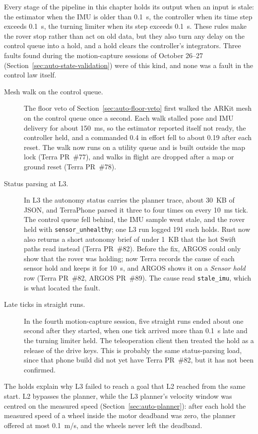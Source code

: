Every stage of the pipeline in this chapter holds its output when an input is stale: the estimator when the IMU is older than 0.1~s, the controller when its time step exceeds 0.1~s, the turning limiter when its step exceeds 0.1~s.
These rules make the rover stop rather than act on old data, but they also turn any delay on the control queue into a hold, and a hold clears the controller's integrators.
Three faults found during the motion-capture sessions of October 26--27 (Section~\ref{sec:auto-state-validation}) were of this kind, and none was a fault in the control law itself.

\begin{description}
\item[Mesh walk on the control queue.] The floor veto of Section~\ref{sec:auto-floor-veto} first walked the ARKit mesh on the control queue once a second. Each walk stalled pose and IMU delivery for about 150~ms, so the estimator reported itself not ready, the controller held, and a commanded 0.4 in effort fell to about 0.19 after each reset. The walk now runs on a utility queue and is built outside the map lock (Terra PR~\#77), and walks in flight are dropped after a map or ground reset (Terra PR~\#78).
\item[Status parsing at L3.] In L3 the autonomy status carries the planner trace, about 30~KB of JSON, and TerraPhone parsed it three to four times on every 10~ms tick. The control queue fell behind, the IMU sample went stale, and the rover held with \texttt{sensor\_unhealthy}; one L3 run logged 191 such holds. Rust now also returns a short autonomy brief of under 1~KB that the hot Swift paths read instead (Terra PR~\#82). Before the fix, ARGOS could only show that the rover was holding; now Terra records the cause of each sensor hold and keeps it for 10~s, and ARGOS shows it on a \emph{Sensor hold} row (Terra PR~\#82, ARGOS PR~\#89). The cause read \texttt{stale\_imu}, which is what located the fault.
\item[Late ticks in straight runs.] In the fourth motion-capture session, five straight runs ended about one second after they started, when one tick arrived more than 0.1~s late and the turning limiter held. The teleoperation client then treated the hold as a release of the drive keys. This is probably the same status-parsing load, since that phone build did not yet have Terra PR~\#82, but it has not been confirmed.
\end{description}

The holds explain why L3 failed to reach a goal that L2 reached from the same start.
L2 bypasses the planner, while the L3 planner's velocity window was centred on the measured speed (Section~\ref{sec:auto-planner}): after each hold the measured speed of a wheel inside the motor deadband was zero, the planner offered at most 0.1~m/s, and the wheels never left the deadband.

